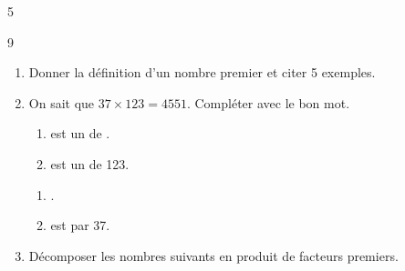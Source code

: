 \documentclass[a4paper]{book}
\begin{document}
{\begin{exerciceNote}{5}
\begin{enumerate}[leftmargin=*]
\begin{minipage}{0.45\linewidth}
                \vspace{1cm}
            \end{minipage}
        \end{enumerate}       
    \end{exerciceNote}


    \begin{exerciceNote}{9}
        \begin{enumerate}[leftmargin=*]
            \item Donner la définition d'un nombre premier et citer 5 exemples.

            \dotfill \newline \medskip \dotfill


            \item On sait que $37\times123=4551$.
            Compléter avec le bon mot.

            \medskip
            
            \begin{minipage}{0.45\linewidth}                
                \begin{enumerate}
                    \item {} est un \points[6] de .

                    \medskip
                    
                    \item {} est un \points[6] de 123.
                \end{enumerate}
            \end{minipage}
            \hfill\vline\hfill
            \begin{minipage}{0.45\linewidth}
                \begin{enumerate}
                    \item {} \points[6] .

                    \medskip
                    
                    \item {} est \points[6] par 37.
                \end{enumerate}
            
            \end{minipage}

            \medskip

            \item Décomposer les nombres suivants en produit de facteurs premiers.


\end{enumerate}
\end{exerciceNote}}
\end{document}
